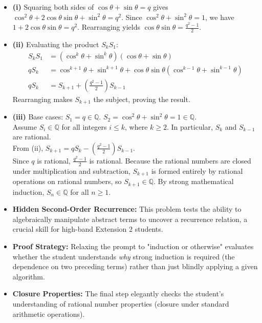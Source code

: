 \begin{solution}
\begin{itemize}
    \item \textbf{(i)} Squaring both sides of $\cos \theta + \sin \theta = q$ gives $\cos^2 \theta + 2\cos \theta \sin \theta + \sin^2 \theta = q^2$. Since $\cos^2 \theta + \sin^2 \theta = 1$, we have $1 + 2\cos \theta \sin \theta = q^2$. Rearranging yields $\cos \theta \sin \theta = \frac{q^2 - 1}{2}$.
    
    \item \textbf{(ii)} Evaluating the product $S_k S_1$:
    \begin{align*}
        S_k S_1 &= (\cos^k \theta + \sin^k \theta)(\cos \theta + \sin \theta) \\
        q S_k &= \cos^{k+1} \theta + \sin^{k+1} \theta + \cos \theta \sin \theta(\cos^{k-1} \theta + \sin^{k-1} \theta) \\
        q S_k &= S_{k+1} + \left(\frac{q^2 - 1}{2}\right)S_{k-1}
    \end{align*}
    Rearranging makes $S_{k+1}$ the subject, proving the result.
    
    \item \textbf{(iii)} Base cases: $S_1 = q \in \mathbb{Q}$. $S_2 = \cos^2 \theta + \sin^2 \theta = 1 \in \mathbb{Q}$. \\
    Assume $S_i \in \mathbb{Q}$ for all integers $i \le k$, where $k \ge 2$. In particular, $S_k$ and $S_{k-1}$ are rational. \\
    From (ii), $S_{k+1} = q S_k - \left(\frac{q^2 - 1}{2}\right)S_{k-1}$. \\
    Since $q$ is rational, $\frac{q^2 - 1}{2}$ is rational. Because the rational numbers are closed under multiplication and subtraction, $S_{k+1}$ is formed entirely by rational operations on rational numbers, so $S_{k+1} \in \mathbb{Q}$. By strong mathematical induction, $S_n \in \mathbb{Q}$ for all $n \ge 1$.
\end{itemize}
\end{solution}

\begin{takeaways}
\begin{itemize}[leftmargin=*]
    \item \textbf{Hidden Second-Order Recurrence:} This problem tests the ability to algebraically manipulate abstract terms to uncover a recurrence relation, a crucial skill for high-band Extension 2 students.
    \item \textbf{Proof Strategy:} Relaxing the prompt to "induction or otherwise" evaluates whether the student understands \textit{why} strong induction is required (the dependence on two preceding terms) rather than just blindly applying a given algorithm.
    \item \textbf{Closure Properties:} The final step elegantly checks the student's understanding of rational number properties (closure under standard arithmetic operations).
\end{itemize}
\end{takeaways}
